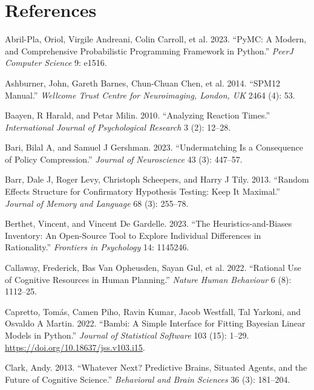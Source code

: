 \documentclass[
  letterpaper,
  DIV=11,
  numbers=noendperiod]{scrartcl}
\newlength{\cslhangindent}
\newenvironment{CSLReferences}[2] %
 {\begin{list}{}{%
  \setlength{\itemindent}{0pt}
  \setlength{\leftmargin}{0pt}
  \setlength{\parsep}{0pt}
  \ifodd #1
   \setlength{\leftmargin}{\cslhangindent}
   \setlength{\itemindent}{-1\cslhangindent}
  \fi
  \setlength{\itemsep}{#2\baselineskip}}}
 {\end{list}}
\begin{document}
\section{References}\label{references}

\protect{}\label{refs}
\begin{CSLReferences}{1}{1}
{Abril-Pla, Oriol, Virgile Andreani, Colin Carroll, et al.} 2023.
{``PyMC: A Modern, and Comprehensive Probabilistic Programming Framework
in Python.''} \emph{PeerJ Computer Science} 9: e1516.

{Ashburner, John, Gareth Barnes, Chun-Chuan Chen, et al.} 2014. {``SPM12
Manual.''} \emph{Wellcome Trust Centre for Neuroimaging, London, UK}
2464 (4): 53.

Baayen, R Harald, and Petar Milin. 2010. {``Analyzing Reaction Times.''}
\emph{International Journal of Psychological Research} 3 (2): 12--28.

Bari, Bilal A, and Samuel J Gershman. 2023. {``Undermatching Is a
Consequence of Policy Compression.''} \emph{Journal of Neuroscience} 43
(3): 447--57.

Barr, Dale J, Roger Levy, Christoph Scheepers, and Harry J Tily. 2013.
{``Random Effects Structure for Confirmatory Hypothesis Testing: Keep It
Maximal.''} \emph{Journal of Memory and Language} 68 (3): 255--78.

Berthet, Vincent, and Vincent De Gardelle. 2023. {``The
Heuristics-and-Biases Inventory: An Open-Source Tool to Explore
Individual Differences in Rationality.''} \emph{Frontiers in Psychology}
14: 1145246.

Callaway, Frederick, Bas Van Opheusden, Sayan Gul, et al. 2022.
{``Rational Use of Cognitive Resources in Human Planning.''}
\emph{Nature Human Behaviour} 6 (8): 1112--25.

Capretto, Tomás, Camen Piho, Ravin Kumar, Jacob Westfall, Tal Yarkoni,
and Osvaldo A Martin. 2022. {``Bambi: A Simple Interface for Fitting
Bayesian Linear Models in Python.''} \emph{Journal of Statistical
Software} 103 (15): 1--29. \url{https://doi.org/10.18637/jss.v103.i15}.

Clark, Andy. 2013. {``Whatever Next? Predictive Brains, Situated Agents,
and the Future of Cognitive Science.''} \emph{Behavioral and Brain
Sciences} 36 (3): 181--204.


\end{CSLReferences}
\end{document}
